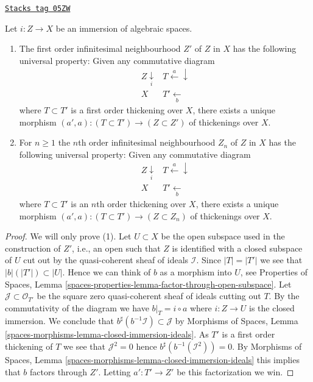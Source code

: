 \begin{lemma}
\label{spaces-more-morphisms-lemma-first-order-infinitesimal-neighbourhood}
\href{https://stacks.math.columbia.edu/tag/05ZW}{\texttt{Stacks tag 05ZW}}

Let $i : Z \to X$ be an immersion of algebraic spaces.
\begin{enumerate}
\item The first order infinitesimal neighbourhood $Z'$ of $Z$ in $X$
has the following universal property:
Given any commutative diagram
$$
\begin{array}{cc}Z \underset{i}{\downarrow} & T \overset{a}{\longleftarrow}\downarrow \\ X & T' \underset{b}{\longleftarrow}\end{array}
$$
where $T \subset T'$ is a first order thickening over $X$, there exists
a unique morphism $(a', a) : (T \subset T') \to (Z \subset Z')$ of
thickenings over $X$.
\item For $n \geq 1$ the $n$th order infinitesimal neighbourhood
$Z_n$ of $Z$ in $X$ has the following universal property:
Given any commutative diagram
$$
\begin{array}{cc}Z \underset{i}{\downarrow} & T \overset{a}{\longleftarrow}\downarrow \\ X & T' \underset{b}{\longleftarrow}\end{array}
$$
where $T \subset T'$ is an $n$th order thickening over $X$, there exists
a unique morphism $(a', a) : (T \subset T') \to (Z \subset Z_n)$ of
thickenings over $X$.
\end{enumerate}
\end{lemma}

\begin{proof}
We will only prove (1).
Let $U \subset X$ be the open subspace used in the construction of $Z'$,
i.e., an open such that $Z$ is identified with a closed subspace of $U$
cut out by the quasi-coherent sheaf of ideals $\mathcal{I}$.
Since $|T| = |T'|$ we see that $|b|(|T'|) \subset |U|$. Hence we can
think of $b$ as a morphism into $U$, see
Properties of Spaces,
Lemma \ref{spaces-properties-lemma-factor-through-open-subspace}.
Let $\mathcal{J} \subset \mathcal{O}_{T'}$
be the square zero quasi-coherent sheaf of ideals cutting out $T$.
By the commutativity of the diagram we have $b|_T = i \circ a$ where
$i : Z \to U$ is the closed immersion. We conclude that
$b^\sharp(b^{-1}\mathcal{I}) \subset \mathcal{J}$ by
Morphisms of Spaces,
Lemma \ref{spaces-morphisms-lemma-closed-immersion-ideals}.
As $T'$ is a first order thickening of $T$ we see that $\mathcal{J}^2 = 0$
hence $b^\sharp(b^{-1}(\mathcal{I}^2)) = 0$. By
Morphisms of Spaces, Lemma \ref{spaces-morphisms-lemma-closed-immersion-ideals}
this implies that $b$ factors through $Z'$. Letting $a' : T' \to Z'$
be this factorization we win.
\end{proof}

